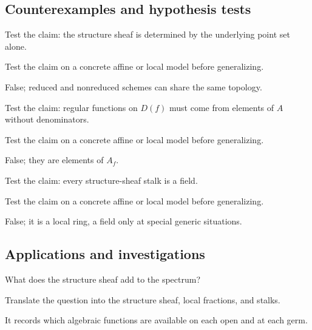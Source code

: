 \subsection*{Counterexamples and hypothesis tests}

\begin{exercise}\label{exr:vi17-expand-10}
Test the claim: the structure sheaf is determined by the underlying point set alone.
\end{exercise}
\begin{hint}
Test the claim on a concrete affine or local model before generalizing.
\end{hint}
\begin{solution}
False; reduced and nonreduced schemes can share the same topology.
\end{solution}

\begin{exercise}\label{exr:vi17-expand-11}
Test the claim: regular functions on $D(f)$ must come from elements of $A$ without denominators.
\end{exercise}
\begin{hint}
Test the claim on a concrete affine or local model before generalizing.
\end{hint}
\begin{solution}
False; they are elements of $A_f$.
\end{solution}

\begin{exercise}\label{exr:vi17-expand-12}
Test the claim: every structure-sheaf stalk is a field.
\end{exercise}
\begin{hint}
Test the claim on a concrete affine or local model before generalizing.
\end{hint}
\begin{solution}
False; it is a local ring, a field only at special generic situations.
\end{solution}

\subsection*{Applications and investigations}

\begin{exercise}\label{exr:vi17-expand-13}
What does the structure sheaf add to the spectrum?
\end{exercise}
\begin{hint}
Translate the question into the structure sheaf, local fractions, and stalks.
\end{hint}
\begin{solution}
It records which algebraic functions are available on each open and at each germ.
\end{solution}

